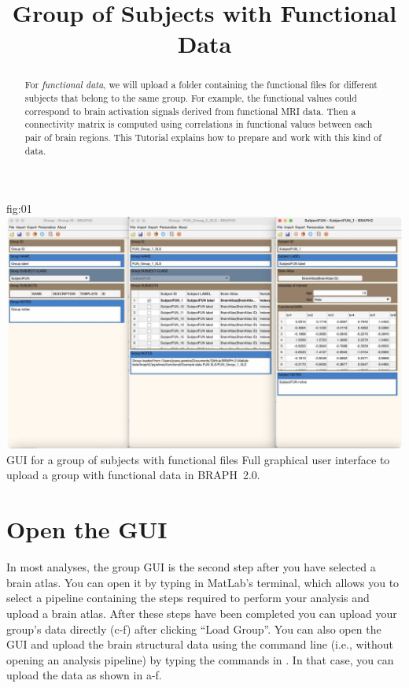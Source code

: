 \documentclass[justified]{tufte-handout}
\title{Group of Subjects with Functional Data}
\begin{document}
\maketitle

\begin{abstract}
\noindent
For \emph{functional data}, we will upload a folder containing the functional files for different subjects that belong to the same group. For example, the functional values could correspond to brain activation signals derived from functional MRI data. Then a connectivity matrix is computed using correlations in functional values between each pair of brain regions. This Tutorial explains how to prepare and work with this kind of data.
\end{abstract}

\tableofcontents

	{fig:01}
	{\includegraphics{fig01.jpg}}
	{GUI for a group of subjects with functional files}
	{
	Full graphical user interface to upload a group with functional data in BRAPH~2.0. 
	}

\clearpage
\section{Open the GUI}

In most analyses, the group GUI is the second step after you have selected a brain atlas. You can open it by typing  in MatLab's terminal, which allows you to select a pipeline containing the steps required to perform your analysis and upload a brain atlas. After these steps have been completed you can upload your group's data directly (c-f) after clicking ``Load Group''. You can also open the GUI and upload the brain structural data using the command line (i.e., without opening an analysis pipeline) by typing the commands in . In that case, you can upload the data as shown in a-f.
\end{document}
